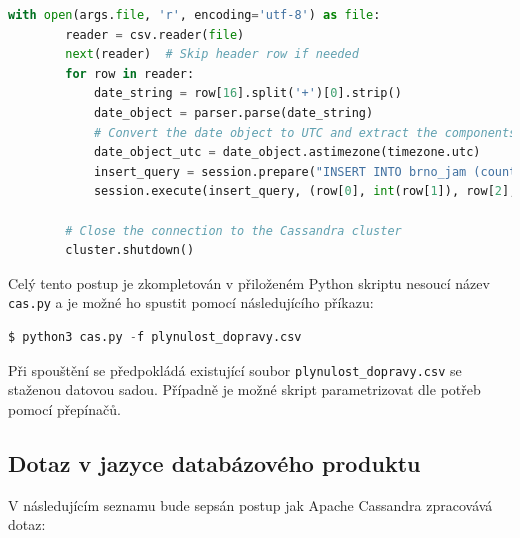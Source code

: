 \documentclass[a4paper, 11pt]{article}
\begin{document}
\begin{enumerate}
\begin{lstlisting}[style=Python, language=Python, framesep=10pt, breaklines=true]
        with open(args.file, 'r', encoding='utf-8') as file:
        reader = csv.reader(file)
        next(reader)  # Skip header row if needed
        for row in reader:
            date_string = row[16].split('+')[0].strip()
            date_object = parser.parse(date_string)
            # Convert the date object to UTC and extract the components
            date_object_utc = date_object.astimezone(timezone.utc)
            insert_query = session.prepare("INSERT INTO brno_jam (country, level, city, speed_KMH, length, uuid, end_node, speed_MS, blocking_Alert_Uuid, road_Type, delay, street, pub_Millis) VALUES (?, ?, ?, ?, ?, ?, ?, ?, ?, ?, ?, ?, ?);")
            session.execute(insert_query, (row[0], int(row[1]), row[2], int(row[3]), int(row[4]), int(row[8]), row[9], int(row[10]), row[11], row[12], int(row[13]), row[14], date_object_utc))
    
        # Close the connection to the Cassandra cluster
        cluster.shutdown()
            \end{lstlisting}
        \end{enumerate}

        Celý tento postup je zkompletován v přiloženém Python skriptu nesoucí název \texttt{cas.py} a je možné ho spustit pomocí následujícího příkazu:


        \begin{lstlisting}[style=Python, language=Python, framesep=10pt]
        $ python3 cas.py -f plynulost_dopravy.csv    
        \end{lstlisting}        

        Při spouštění se předpokládá existující soubor \texttt{plynulost\_dopravy.csv} se staženou datovou sadou. Případně je možné skript parametrizovat dle potřeb pomocí přepínačů.
    
    \subsection{Dotaz v jazyce databázového produktu}
    V následujícím seznamu bude sepsán postup jak Apache Cassandra zpracovává dotaz:
\end{document}
